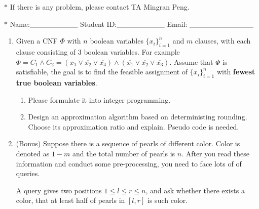 \documentclass[12pt,a4paper]{article}
\theoremstyle{definition}
\begin{document}
\noindent

\noindent{}


\begin{center}
\footnotesize{\color{red}$*$ If there is any problem, please contact TA Mingran Peng.}\par
\footnotesize{\color{blue}$*$ Name:\_\_\_\_\_\_\_\_\_  \quad Student ID:\_\_\_\_\_\_\_\_\_ \quad Email: \_\_\_\_\_\_\_\_\_\_\_\_}
\end{center}
\begin{enumerate}
    

\item Given a CNF $\Phi$ with $n$ boolean variables $\{x_i\}_{i=1}^n$ and $m$ clauses, with each clause consisting of $3$ boolean variables. For example $\Phi=C_1\wedge C_2 =(x_1\vee \overline{x_2}\vee \overline{x_4})\wedge (\overline{x_1} \vee \overline{x_2} \vee \overline{x_3})$. Assume that $\Phi$ is satisfiable, the goal is to find the feasible assignment of $\{x_i\}_{i=1}^n$ with \textbf{fewest true boolean variables}.
\begin{enumerate}
\item  Please formulate it into integer programming.\par
\item  Design an approximation algorithm based on deterministing rounding. Choose its approximation ratio and explain. Pseudo code is needed.\par
\end{enumerate}
\item
\color{red}(Bonus)\color{black} Suppose there is a sequence of pearls of different color. Color is denoted as $1-m$ and the total number of pearls is $n$. After you read these information and conduct some pre-processing, you need to face lots of of queries.\par
A query gives two positions $1\leq l\leq r \leq n$, and ask whether there exists a color, that at least half of pearls in $[l,r]$ is such color.\par


\end{enumerate}
\end{document}
